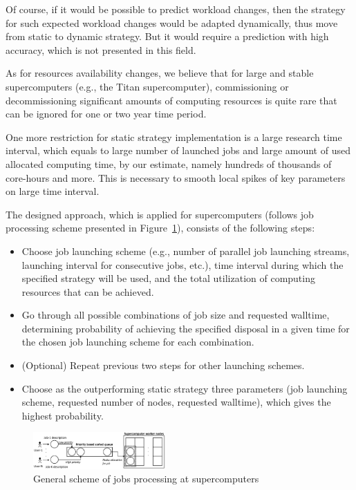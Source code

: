 Of course, if it would be possible to predict workload changes, then the
strategy for such expected workload changes would be adapted dynamically,
thus move from static to dynamic strategy. But it would require a prediction
with high accuracy, which is not presented in this field.

As for resources availability changes, we believe that for large and stable
supercomputers (e.g., the Titan supercomputer), commissioning or
decommissioning significant amounts of computing resources is quite rare
that can be ignored for one or two year time period.

One more restriction for static strategy implementation is a large research
time interval, which equals to large number of launched jobs and large
amount of used allocated computing time, by our estimate, namely hundreds of
thousands of core-hours and more. This is necessary to smooth local spikes
of key parameters on large time interval.

The designed approach, which is applied for supercomputers (follows job
processing scheme presented in
Figure~\ref{fig-job-processing-general-scheme}), consists of the following
steps:
\begin{itemize}
    \item Choose job launching scheme (e.g., number of parallel job
    launching streams, launching interval for consecutive jobs, etc.), time
    interval during which the specified strategy will be used, and the total
    utilization of computing resources that can be achieved.
    \item Go through all possible combinations of job size and requested
    walltime, determining probability of achieving the specified disposal in
    a given time for the chosen job launching scheme for each combination.
    \item (Optional) Repeat previous two steps for other launching schemes.
    \item Choose as the outperforming static strategy three parameters (job
    launching scheme, requested number of nodes, requested walltime), which
    gives the highest probability.
\end{itemize}

\begin{figure}
    \centering
    \includegraphics[width=0.45\textwidth]{pics/job-processing-general-scheme.png}
    \caption{General scheme of jobs processing at supercomputers}
    \label{fig-job-processing-general-scheme} 
\end{figure}


